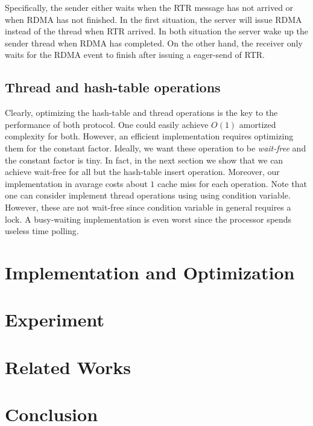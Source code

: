 \documentclass[11pt]{article}
\begin{document}
Specifically, the sender either waits when the RTR message has not arrived or
when RDMA has not finished. In the first situation, the server will issue RDMA
instead of the thread when RTR arrived. In both situation the server wake up
the sender thread when RDMA has completed. On the other hand, the receiver only
waits for the RDMA event to finish after issuing a eager-send of RTR.

\subsection{Thread and hash-table operations}
Clearly, optimizing the hash-table and thread operations is the key to the
performance of both protocol. One could easily achieve $O(1)$ amortized
complexity for both.  However, an efficient implementation requires optimizing
them for the constant factor. Ideally, we want these operation to be
\textit{wait-free} and the constant factor is tiny. In fact, in the next
section we show that we can achieve wait-free for all but the hash-table insert
operation.  Moreover, our implementation in avarage costs about $1$ cache miss
for each operation. Note that one can consider implement thread operations
using using condition variable. However, these are not wait-free since
condition variable in general requires a lock. A busy-waiting implementation is
even worst since the processor spends useless time polling.

\section{Implementation and Optimization}

\section{Experiment}
\section{Related Works}
\section{Conclusion}
\end{document}
